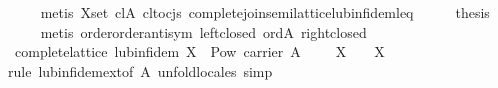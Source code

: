 \begin{isabellebody}
\ \ \ \ \isamarkupfalse%
\ {}metis\ X{}set\ cl{}A\ cl{}to{}cjs\ complete{}join{}semilattice{}lub{}inf{}idem{}leq{}\isanewline
\ \ \isamarkupfalse%
\ \isamarkupfalse%
\ {}thesis\isanewline
\ \ \ \ \isamarkupfalse%
\ {}metis\ order{}order{}antisym\ left{}closed\ ord{}A\ right{}closed{}\isanewline
{}\isamarkupfalse%
%
\endisatagproof
{\isafoldproof}%
%
\isadelimproof
\isanewline
%
\endisadelimproof
\isanewline
{}\isamarkupfalse%
\ {}\ complete{}lattice{}\ lub{}inf{}idem{}\ {}X\ {}\ Pow\ {}carrier\ A{}\ {}\ {}\ {}{}\ {}\ X{}\ {}\ {}\ {}{}\ X{}{}\isanewline
%
\isadelimproof
\ \ %
\endisadelimproof
%
\isatagproof
{}\isamarkupfalse%
\ {}rule\ lub{}inf{}idem{}ext{}of\ A{}{}\ unfold{}locales{}\ simp{}%

\end{isabellebody}
